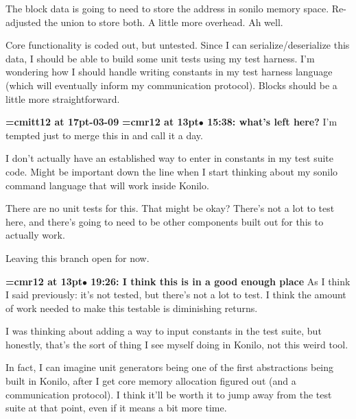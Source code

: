 The block data is going to need to store the address in sonilo memory space. Re-adjusted the union to store both. A little more overhead. Ah well.
\par

Core functionality is coded out, but untested. Since I can serialize/deserialize this data, I should be able to build some unit tests using my test harness. I'm wondering how I should handle writing constants in my test harness language (which will eventually inform my communication protocol). Blocks should be a little more straightforward.
\par

{\medskip\noindent\bf\font\titlefont=cmitt12 at 17pt-03-09}\medskip
{\smallskip\noindent\bf\font\titlefont=cmr12 at 13pt\titlefont $\bullet$ 15:38: what's left here?}\smallskip
I'm tempted just to merge this in and call it a day.
\par

I don't actually have an established way to enter in constants in my test suite code. Might be important down the line when I start thinking about my sonilo command language that will work inside Konilo.
\par

There are no unit tests for this. That might be okay? There's not a lot to test here, and there's going to need to be other components built out for this to actually work.
\par

Leaving this branch open for now.
\par

{\smallskip\noindent\bf\font\titlefont=cmr12 at 13pt\titlefont $\bullet$ 19:26: I think this is in a good enough place}\smallskip
As I think I said previously: it's not tested, but there's not a lot to test. I think the amount of work needed to make this testable is diminishing returns.
\par

I was thinking about adding a way to input constants in the test suite, but honestly, that's the sort of thing I see myself doing in Konilo, not this weird tool.
\par

In fact, I can imagine unit generators being one of the first abstractions being built in Konilo, after I get core memory allocation figured out (and a communication protocol). I think it'll be worth it to jump away from the test suite at that point, even if it means a bit more time.
\par


